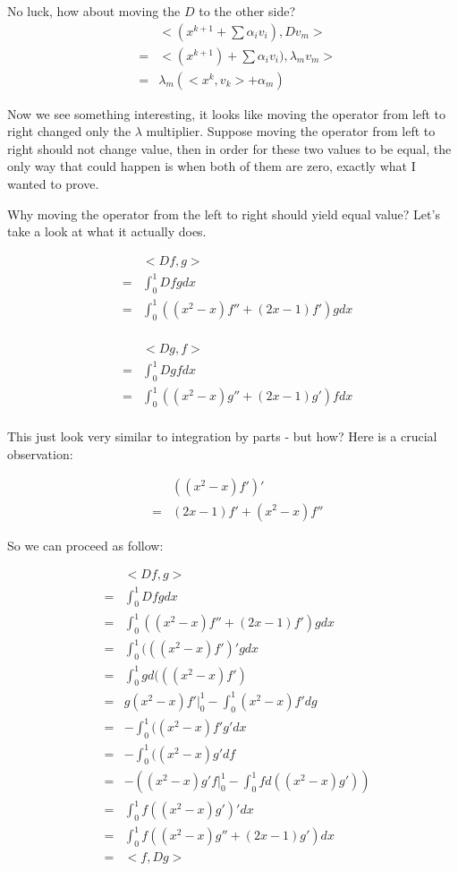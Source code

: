 No luck, how about moving the $ D $ to the other side?
\begin{eqnarray*}
  & & <(x^{k+1} + \sum\alpha_i v_i), D v_m> \\
  &=& <(x^{k+1}) + \sum \alpha_i v_i), \lambda_m v_m> \\
  &=& \lambda_{m}(<x^k, v_k> + \alpha_m) 
\end{eqnarray*}

Now we see something interesting, it looks like moving the operator from left to right changed only the $ \lambda $ multiplier. Suppose moving the operator from left to right should not change value, then in order for these two values to be equal, the only way that could happen is when both of them are zero, exactly what I wanted to prove. 

Why moving the operator from the left to right should yield equal value? Let's take a look at what it actually does.

\begin{eqnarray*}
  & & <Df, g> \\
  &=& \int_0^1 Df g dx \\
  &=& \int_0^1 ((x^2 - x)f'' + (2x - 1)f') g dx \\
\end{eqnarray*}

\begin{eqnarray*}
  & & <Dg, f> \\
  &=& \int_0^1 Dg f dx \\
  &=& \int_0^1 ((x^2 - x)g'' + (2x - 1)g') f dx \\
\end{eqnarray*}

This just look very similar to integration by parts - but how? Here is a crucial observation:

\begin{eqnarray*}
   & & ((x^2 - x)f')' \\
   &=& (2x - 1)f' + (x^2 - x)f''
\end{eqnarray*}

So we can proceed as follow:

\begin{eqnarray*}
  & & <Df, g> \\
  &=& \int_0^1 Df g dx \\
  &=& \int_0^1 ((x^2 - x)f'' + (2x - 1)f') g dx \\
  &=& \int_0^1 (((x^2 - x)f')' g dx \\
  &=& \int_0^1 g d(((x^2 - x)f') \\
  &=& g(x^2 - x)f'|_0^1 - \int_0^1 (x^2 - x)f' dg \\
  &=& - \int_0^1 ((x^2 - x)f'g' dx \\
  &=& - \int_0^1 ((x^2 - x)g' df \\
  &=& - \left((x^2 - x)g'f|_0^1 - \int_0^1 f d((x^2 - x)g')\right) \\
  &=& \int_0^1 f ((x^2 - x)g')'dx \\
  &=& \int_0^1 f ((x^2 - x)g'' + (2x - 1)g') dx \\
  &=& <f, Dg>
\end{eqnarray*}

